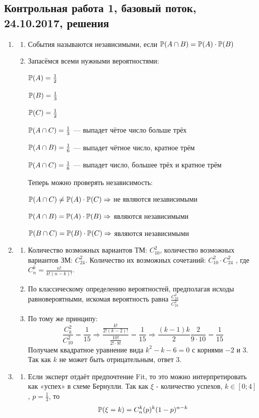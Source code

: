 \subsection{Контрольная работа 1, базовый поток, 24.10.2017, решения}

\begin{enumerate}
\item
\begin{enumerate}
\item События называются независимыми, если  $ \P(A \cap B) = \P(A) \cdot \P(B)$
\item Запасёмся всеми нужными вероятностями:

$\P(A) = \frac{1}{2}$

$\P(B) = \frac{1}{3}$

$\P(C) = \frac{1}{2}$

$\P(A \cap C) = \frac{1}{3} $ — выпадет чётое число больше трёх

$\P(A \cap B)  = \frac{1}{6}$ — выпадет чётное число, кратное трём

$\P(A \cap C) = \frac{1}{6}$ — выпадет число, большее трёх и кратное трём

Теперь можно проверять независимость:

$\P(A \cap C) \neq \P(A) \cdot \P(C) \Rightarrow$  не являются независимыми

$ \P(A \cap B) = \P(A) \cdot \P(B) \Rightarrow$ являются независимыми

$ \P(B \cap C) = \P(B) \cdot \P(C) \Rightarrow$ являются независимыми

\end{enumerate}
\item
\begin{enumerate}
\item Количество возможных вариантов ТМ: $ C_{10}^2 $,  количество возможных вариантов ЗМ: $ C_{24}^2 $. Количество их возможных сочетаний: $ C_{10}^2 \cdot C_{24}^2$ , где $ C_n^k = \frac{n!}{k!(n-k)!}$.
\item По классическому определению вероятностей, предполагая исходы равновероятными, искомая вероятность равна $ \frac{C_{16}^2}{C_{24}^2} $
\item По тому же принципу:
\[
\frac{C_k^2}{C_{10}^2} = \frac{1}{15} \Rightarrow \frac{\frac{k!}{2!(k-2)!}}{\frac{10!}{2! \cdot 8!}} = \frac{1}{15} \Rightarrow \frac{(k-1)k}{2}\frac{ 2}{9 \cdot 10} = \frac{1}{15}
\]
Получаем квадратное уравнение вида $ k^2 - k - 6 = 0 $ с корнями $-2$ и $3$. Так как $k$ не может быть отрицательным, ответ $3$.
\end{enumerate}
\item
\begin{enumerate}
\item Если эксперт отдаёт предпочтение Fit, то это можно интерпретировать как «успех» в схеме Бернулли. Так как $\xi$ - количество успехов, $ k \in [0;4]$, $p = \frac{1}{3} $, то
\[
\P(\xi = k) = C_n^k(p)^k(1-p)^{n-k}
\]


\end{enumerate}
\end{enumerate}
